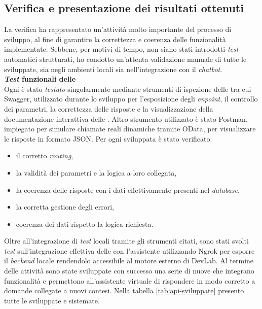 \subsection{Verifica e presentazione dei risultati ottenuti}
La verifica ha rappresentato un'attività molto importante del processo di sviluppo, al fine di garantire la correttezza e coerenza delle funzionalità implementate.
Sebbene, per motivi di tempo, non siano stati introdotti \textit{test} automatici strutturati, ho condotto un'attenta validazione manuale di tutte le  sviluppate, sia negli ambienti locali sia nell'integrazione con il \textit{chatbot}.\\
\textbf{\textit{Test} funzionali delle } \\ 
Ogni  è stato \textit{testato} singolarmente mediante strumenti di ispezione delle  tra cui Swagger, utilizzato durante lo sviluppo per l'esposizione degli \textit{enpoint}, il controllo dei parametri, la correttezza delle risposte  e la visualizzazione della documentazione interattiva delle . Altro strumento utilizzato è stato Postman, impiegato per simulare chiamate reali dinamiche tramite OData, per visualizzare le risposte in formato JSON.
Per ogni  sviluppata è stato verificato: 
\begin{itemize}
    \item il corretto \textit{routing},
    \item la validità dei parametri e la logica a loro collegata,
    \item la coerenza delle risposte con i dati effettivamente presenti nel \textit{database},
    \item la corretta gestione degli errori,
    \item coerenza dei dati rispetto la logica richiesta.
\end{itemize}
Oltre all'integrazione di \textit{test} locali tramite gli strumenti citati, sono stati svolti \textit{test} sull'integrazione effettiva delle  con l'assistente utilizzando Ngrok per esporre il \textit{backend} locale rendendolo accessibile al motore esterno di DevLab.
Al termine delle attività sono state sviluppate con successo una serie di nuove  che integrano funzionalità e permettono all'assistente virtuale di rispondere in modo corretto a domande collegate a nuovi contesi.
Nella tabella \ref{tab:api-sviluppate} presento tutte le  sviluppate e sistemate.

